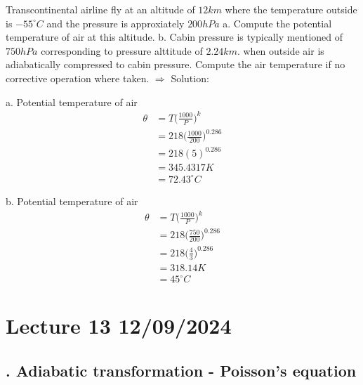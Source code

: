 \documentclass[fleqn,10pt]{SelfArx} %
\begin{document}
\begin{question}[q:12.1]{Transcontinental airline fly at an altitude of $12 km$ where the temperature outside is $-55^{\circ}C$ and the pressure is approxiately $200 hPa$ \newline
    a. Compute the potential temperature of air at this altitude. \newline
    b. Cabin pressure is typically mentioned of $750 hPa$ corresponding to pressure alttitude of $2.24 km$. when outside air is adiabatically compressed to cabin pressure$.$ Compute the air temperature if no corrective operation where taken.
}
$\Rightarrow$ Solution:

a. Potential temperature of air
\begin{align*}
    \theta &= T \Big(\frac{1000}{P}\Big)^k \\ 
           &= 218 \Big(\frac{1000}{200}\Big)^{0.286}\\ 
           &= 218 (5)^{0.286}\\ 
           &= 345.4317 K \\
           &= 72.43 ^\circ C
\end{align*}

b. Potential temperature of air 
\begin{align*}
    \theta &= T \Big(\frac{1000}{P}\Big)^k \\ 
           &= 218 \Big(\frac{750}{200}\Big)^{0.286}\\ 
           &= 218 \Big(\frac{4}{3}\Big)^{0.286}\\ 
           &= 318.14 K \\
           &= 45 ^\circ C
\end{align*}
\end{question}

\clearpage

\section{Lecture 13 12/09/2024}
\subsection{. Adiabatic transformation - Poisson's equation}
\end{document}
